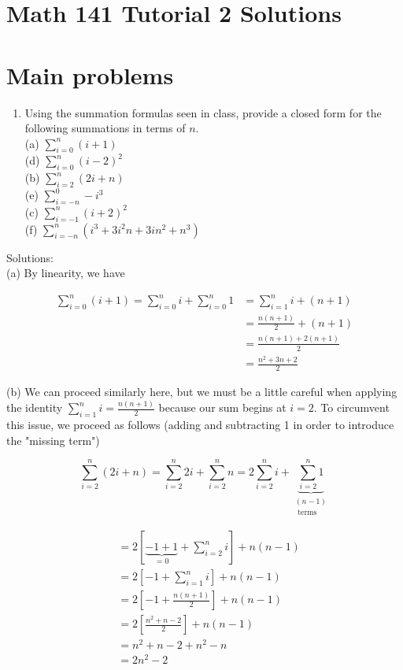 \documentclass[10pt]{article}
\begin{document}
\section*{Math 141 Tutorial 2 Solutions}
\section*{Main problems}
\begin{enumerate}
  \item Using the summation formulas seen in class, provide a closed form for the following summations in terms of $n$.\\
(a) $\sum_{i=0}^{n}(i+1)$\\
(d) $\sum_{i=0}^{n}(i-2)^{2}$\\
(b) $\sum_{i=2}^{n}(2 i+n)$\\
(e) $\sum_{i=-n}^{0}-i^{3}$\\
(c) $\sum_{i=-1}^{n}(i+2)^{2}$\\
(f) $\sum_{i=-n}^{n}\left(i^{3}+3 i^{2} n+3 i n^{2}+n^{3}\right)$
\end{enumerate}

Solutions:\\
(a) By linearity, we have

$$
\begin{aligned}
\sum_{i=0}^{n}(i+1)=\sum_{i=0}^{n} i+\sum_{i=0}^{n} 1 & =\sum_{i=1}^{n} i+(n+1) \\
& =\frac{n(n+1)}{2}+(n+1) \\
& =\frac{n(n+1)+2(n+1)}{2} \\
& =\frac{n^{2}+3 n+2}{2}
\end{aligned}
$$

(b) We can proceed similarly here, but we must be a little careful when applying the identity $\sum_{i=1}^{n} i=\frac{n(n+1)}{2}$ because our sum begins at $i=2$. To circumvent this issue, we proceed as follows (adding and subtracting 1 in order to introduce the "missing term")

$$
\sum_{i=2}^{n}(2 i+n)=\sum_{i=2}^{n} 2 i+\sum_{i=2}^{n} n=2 \sum_{i=2}^{n} i+\underbrace{\sum_{i=2}^{n} 1}_{\substack{(n-1) \\ \text { terms }}}
$$

$$
\begin{aligned}
& =2[\underbrace{-1+1}_{=0}+\sum_{i=2}^{n} i]+n(n-1) \\
& =2\left[-1+\sum_{i=1}^{n} i\right]+n(n-1) \\
& =2\left[-1+\frac{n(n+1)}{2}\right]+n(n-1) \\
& =2\left[\frac{n^{2}+n-2}{2}\right]+n(n-1) \\
& =n^{2}+n-2+n^{2}-n \\
& =2 n^{2}-2
\end{aligned}
$$
\end{document}
